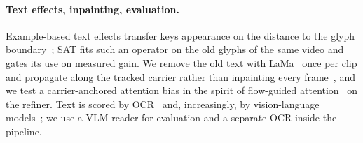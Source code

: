 \paragraph{Text effects, inpainting, evaluation.} Example-based text effects transfer keys appearance on the distance to the glyph boundary~\cite{yang2017awesometypography,men2019dyntypo,yang2019tetgan}; SAT fits such an operator on the old glyphs of the same video and gates its use on measured gain. We remove the old text with LaMa~\cite{suvorov2022lama} once per clip and propagate along the tracked carrier rather than inpainting every frame~\cite{zhou2023propainter,bian2025videopainter}, and we test a carrier-anchored attention bias in the spirit of flow-guided attention~\cite{cong2024flatten,geyer2024tokenflow} on the refiner. Text is scored by OCR~\cite{baek2019craft,shi2017crnn,du2020ppocr} and, increasingly, by vision-language models~\cite{bai2025qwen25vl}; we use a VLM reader for evaluation and a separate OCR inside the pipeline.
